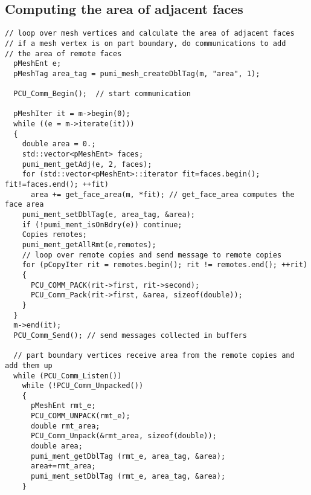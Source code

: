 \subsection{Computing the area of adjacent faces}
\begin{small}
\begin{verbatim}
// loop over mesh vertices and calculate the area of adjacent faces
// if a mesh vertex is on part boundary, do communications to add 
// the area of remote faces
  pMeshEnt e;
  pMeshTag area_tag = pumi_mesh_createDblTag(m, "area", 1);

  PCU_Comm_Begin();  // start communication

  pMeshIter it = m->begin(0);
  while ((e = m->iterate(it)))
  {
    double area = 0.;
    std::vector<pMeshEnt> faces;
    pumi_ment_getAdj(e, 2, faces);
    for (std::vector<pMeshEnt>::iterator fit=faces.begin(); fit!=faces.end(); ++fit)
      area += get_face_area(m, *fit); // get_face_area computes the face area
    pumi_ment_setDblTag(e, area_tag, &area);
    if (!pumi_ment_isOnBdry(e)) continue;
    Copies remotes;
    pumi_ment_getAllRmt(e,remotes);
    // loop over remote copies and send message to remote copies
    for (pCopyIter rit = remotes.begin(); rit != remotes.end(); ++rit)
    {
      PCU_COMM_PACK(rit->first, rit->second);
      PCU_Comm_Pack(rit->first, &area, sizeof(double));
    }
  }
  m->end(it);
  PCU_Comm_Send(); // send messages collected in buffers

  // part boundary vertices receive area from the remote copies and add them up
  while (PCU_Comm_Listen())
    while (!PCU_Comm_Unpacked())
    {
      pMeshEnt rmt_e;
      PCU_COMM_UNPACK(rmt_e);
      double rmt_area;
      PCU_Comm_Unpack(&rmt_area, sizeof(double));
      double area;
      pumi_ment_getDblTag (rmt_e, area_tag, &area);
      area+=rmt_area;
      pumi_ment_setDblTag (rmt_e, area_tag, &area);      
    }
\end{verbatim}
\end{small}


